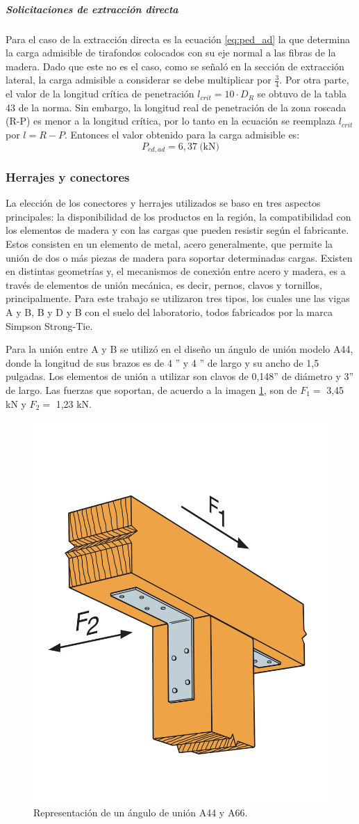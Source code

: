 \subparagraph{Solicitaciones de extracción directa}
Para el caso de la extracción directa es la ecuación \ref{eq:ped_ad} la que determina la carga admisible de tirafondos colocados con su eje normal a las fibras de la madera. Dado que este no es el caso, como se señaló en la sección de extracción lateral, la carga admisible a considerar se debe multiplicar por $\frac{3}{4}$. Por otra parte, el valor de la longitud crítica de penetración $l_{crit}=10\cdot D_R$ se obtuvo de la tabla 43 de la norma. Sin embargo, la longitud real de penetración de la zona roscada (R-P) es menor a la longitud crítica, por lo tanto en la ecuación se reemplaza $l_{crit}$ por $l = R-P$. Entonces el valor obtenido para la carga admisible es:
\begin{equation}
	P_{ed,ad} = 6,37 \: \text{(kN)}
\end{equation} 

\subsubsection{Herrajes y conectores}
La elección de los conectores y herrajes utilizados se baso en tres aspectos principales: la disponibilidad de los productos en la región, la compatibilidad con los elementos de madera y con las cargas que pueden resistir según el fabricante. Estos consisten en un elemento de metal, acero generalmente, que permite la unión de dos o más piezas de madera para soportar determinadas cargas. Existen en distintas geometrías y, el mecanismos de conexión entre acero y madera, es a través de elementos de unión mecánica, es decir, pernos, clavos y tornillos, principalmente. Para este trabajo se utilizaron tres tipos, los cuales une las vigas A y B, B y D y B con el suelo del laboratorio, todos fabricados por la marca Simpson Strong-Tie.

Para la unión entre A y B se utilizó en el diseño un ángulo de unión modelo A44, donde la longitud de sus brazos es de 4 '' y 4 '' de largo y su ancho de 1,5 pulgadas. Los elementos de unión a utilizar son clavos de 0,148'' de diámetro y 3'' de largo. Las fuerzas que soportan, de acuerdo a la imagen \ref{fig:a24}, son de $F_1=$ 3,45 kN y $F_2=$ 1,23 kN. 

\begin{figure}[h]
\centering
\includegraphics[width=0.3\linewidth]{Imagenes/a24.pdf}
\caption{Representación de un ángulo de unión A44 y A66. \cite{angleconnector}}
\label{fig:a24}
\end{figure} 

